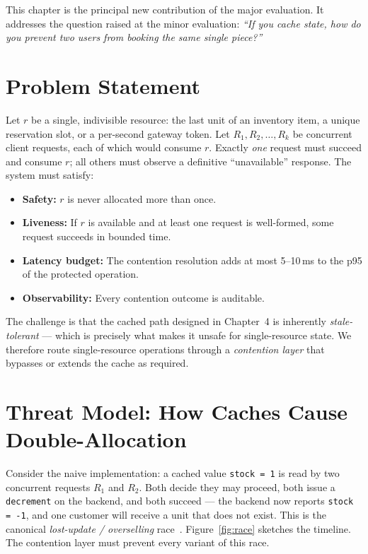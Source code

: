 \documentclass[12pt,a4paper,oneside]{report}
\begin{document}
This chapter is the principal new contribution of the major evaluation. It addresses the question raised at the minor evaluation: \emph{``If you cache state, how do you prevent two users from booking the same single piece?''}

\section{Problem Statement}
Let $r$ be a single, indivisible resource: the last unit of an inventory item, a unique reservation slot, or a per-second gateway token. Let $R_1, R_2, \ldots, R_k$ be concurrent client requests, each of which would consume $r$. Exactly \emph{one} request must succeed and consume $r$; all others must observe a definitive ``unavailable'' response. The system must satisfy:
\begin{itemize}[leftmargin=*]
    \item \textbf{Safety:} $r$ is never allocated more than once.
    \item \textbf{Liveness:} If $r$ is available and at least one request is well-formed, some request succeeds in bounded time.
    \item \textbf{Latency budget:} The contention resolution adds at most 5--10\,ms to the p95 of the protected operation.
    \item \textbf{Observability:} Every contention outcome is auditable.
\end{itemize}

The challenge is that the cached path designed in Chapter~4 is inherently \emph{stale-tolerant} --- which is precisely what makes it unsafe for single-resource state. We therefore route single-resource operations through a \emph{contention layer} that bypasses or extends the cache as required.

\section[Threat Model]{Threat Model: How Caches Cause Double-Allocation}
Consider the naive implementation: a cached value \texttt{stock = 1} is read by two concurrent requests $R_1$ and $R_2$. Both decide they may proceed, both issue a \texttt{decrement} on the backend, and both succeed --- the backend now reports \texttt{stock = -1}, and one customer will receive a unit that does not exist. This is the canonical \emph{lost-update / overselling} race~\cite{oneuptime2026inventory, amitavroy2026hotel}. Figure~\ref{fig:race} sketches the timeline. The contention layer must prevent every variant of this race.
\end{document}
